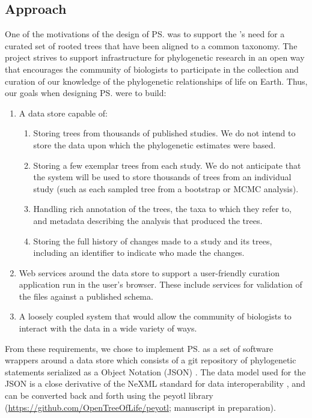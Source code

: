 \subsection{Approach}
One of the motivations of the design of \ps was to support the \otol's need for a curated set
    of rooted trees that have been aligned to a common taxonomy.
The \otol project strives to support infrastructure for phylogenetic
    research in an open way that encourages the community of biologists to participate in the 
    collection and curation of our knowledge of the phylogenetic relationships of life on Earth.
Thus, our goals when designing \ps were to build: 
\begin{enumerate}
    \item  A data store capable of:
        \begin{enumerate}
            \item \label{fewKStudies} Storing trees from thousands of published studies. We do not intend to store the 
                data upon which the phylogenetic estimates were based.
            \item \label{fewTreesPerStudy} Storing a few exemplar trees from each study. We do not anticipate that the system will be used 
                to store thousands of trees from 
                an individual study (such as each sampled tree from a bootstrap or MCMC analysis).
            \item \label{richAnnot} Handling rich annotation of the trees, the taxa to which they refer to, and metadata describing 
                the analysis that produced the trees.
            \item \label{history} Storing the full history of changes made to a study and its trees,
                including an identifier to indicate who made the changes.
        \end{enumerate}
    \item \label{ws} Web services around the data store to support a user-friendly curation application run in the user's browser. These include services for validation of the files against a published schema.
    \item \label{looseOpen} A loosely coupled system that would allow the community of biologists to interact with the data in a wide variety of ways.
\end{enumerate}
From these requirements, we chose to implement \ps as a set of software wrappers around a data store
    which consists of a git \citep{git} repository of phylogenetic statements serialized as a \js Object Notation (JSON) \citep{Crockford2006}.
The data model used for the JSON is a close derivative of the NeXML standard for data interoperability \citep{NeXML},
  and can be converted back and forth using the peyotl library (\url{https://github.com/OpenTreeOfLife/peyotl}; manuscript in preparation).

